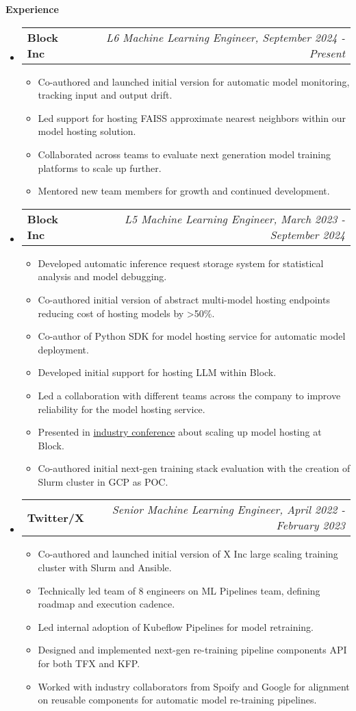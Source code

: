 \documentclass[letterpaper,10pt]{article}
\makeatletter
\newcommand{\resitem}[1]{\item #1 \vspace{-2pt}}
\newcommand{\resheading}[1]{{\large \colorbox{mygrey}{\begin{minipage}{\textwidth}{\textbf{#1 \vphantom{p\^{E}}}}\end{minipage}}}}
\newcommand{\ressubheading}[4]{
\begin{tabular*}{7.0in}{l@{\extracolsep{\fill}}r}
		\textbf{#1} & \textit{#4} \\
\end{tabular*}\vspace{-6pt}}
\makeatother
\begin{document}
\resheading{Experience}
	\begin{itemize}
		\item
		\ressubheading{Block Inc}{Houston, TX}{L6 Machine Learning Engineer}{L6 Machine Learning Engineer, September 2024 - Present}
		\begin{itemize}
			\resitem{Co-authored and launched initial version for automatic model monitoring, tracking input and output drift.}
			\resitem{Led support for hosting FAISS approximate nearest neighbors within our model hosting solution.}
			\resitem{Collaborated across teams to evaluate next generation model training platforms to scale up further.}
			\resitem{Mentored new team members for growth and continued development.}
		\end{itemize}
		\item
			\ressubheading{Block Inc}{Boulder, CO}{L5 Machine Learning Engineer}{L5 Machine Learning Engineer, March 2023 - September 2024}
			\begin{itemize}
				\resitem{Developed automatic inference request storage system for statistical analysis and model debugging.}
				\resitem{Co-authored initial version of abstract multi-model hosting endpoints reducing cost of hosting models by >50\%.}
				\resitem{Co-author of Python SDK for model hosting service for automatic model deployment.}
				\resitem{Developed initial support for hosting LLM within Block.}
				\resitem{Led a collaboration with different teams across the company to improve reliability for the model hosting service.}
				\resitem{Presented in \href{https://www.youtube.com/watch?v=5WPrZgUu8u0}{industry conference} about scaling up model hosting at Block.}
				\resitem{Co-authored initial next-gen training stack evaluation with the creation of Slurm cluster in GCP as POC.}
			\end{itemize}
		\item
			\ressubheading{Twitter/X}{Boulder, CO}{Senior Machine Learning Engineer}{Senior Machine Learning Engineer, April 2022 - February 2023}
			\begin{itemize}
				\resitem{Co-authored and launched initial version of X Inc large scaling training cluster with Slurm and Ansible.}
				\resitem{Technically led team of 8 engineers on ML Pipelines team, defining roadmap and execution cadence.} 
				\resitem{Led internal adoption of Kubeflow Pipelines for model retraining.}
				\resitem{Designed and implemented next-gen re-training pipeline components API for both TFX and KFP.}
				\resitem{Worked with industry collaborators from Spoify and Google for alignment on reusable components for automatic model re-training pipelines.}

\end{itemize}
\end{itemize}
\end{document}
